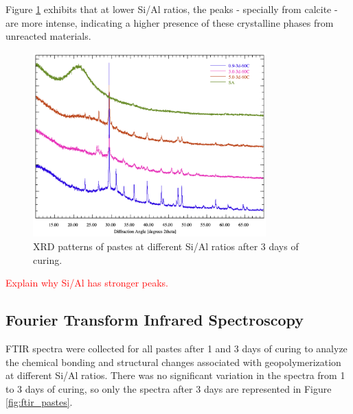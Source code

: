 Figure \ref{fig:xrd_pastes} exhibits that at lower Si/Al ratios, the peaks - specially from calcite - are more intense, indicating a higher presence of these crystalline phases from unreacted materials.


\begin{figure}[H]
    \centering
    \includegraphics[width=0.8\textwidth]{Cap4/images/xrd_pastes_shifted.png}
    \caption{XRD patterns of pastes at different Si/Al ratios after 3 days of curing.}
    \label{fig:xrd_pastes}
\end{figure}

\textcolor{red}{Explain why Si/Al has stronger peaks.}

\subsection{Fourier Transform Infrared Spectroscopy}

FTIR spectra were collected for all pastes after 1 and 3 days of curing to analyze the chemical bonding and structural changes associated with geopolymerization at different Si/Al ratios.
There was no significant variation in the spectra from 1 to 3 days of curing, so only the spectra after 3 days are represented in Figure \ref{fig:ftir_pastes}.

